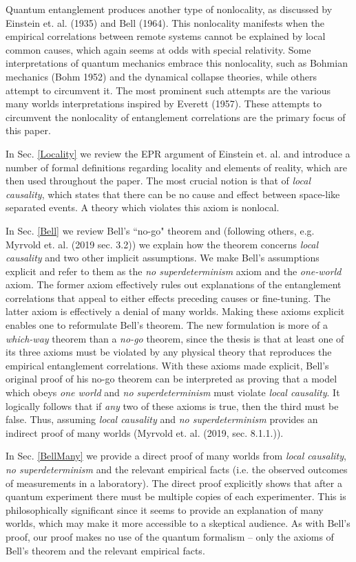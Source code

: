 \documentclass[a4paper]{article}
\begin{document}
Quantum entanglement produces another type of nonlocality, as discussed by Einstein et. al. (1935) and Bell (1964). This nonlocality manifests when the empirical correlations between remote systems cannot be explained by local common causes, which again seems at odds with special relativity. Some interpretations of quantum mechanics embrace this nonlocality, such as Bohmian mechanics (Bohm 1952) and the dynamical collapse theories, while others attempt to circumvent it. The most prominent such attempts are the various many worlds interpretations inspired by Everett (1957). These attempts to circumvent the nonlocality of entanglement correlations are the primary focus of this paper.

In Sec. \ref{Locality} we review the EPR argument of Einstein et. al. and introduce a number of formal definitions regarding locality and elements of reality, which are then used throughout the paper. The most crucial notion is that of \textit{local causality}, which states that there can be no cause and effect between space-like separated events. A theory which violates this axiom is nonlocal.

In Sec. \ref{Bell} we review Bell's ``no-go" theorem and (following others, e.g. Myrvold et. al. (2019 sec. 3.2)) we explain how the theorem concerns \textit{local causality} and two other implicit assumptions. We make Bell's assumptions explicit and refer to them as the \textit{no superdeterminism} axiom and the \textit{one-world} axiom. The former axiom effectively rules out explanations of the entanglement correlations that appeal to either effects preceding causes or fine-tuning. The latter axiom is effectively a denial of many worlds. Making these axioms explicit enables one to reformulate Bell's theorem. The new formulation is more of a \textit{which-way} theorem than a \textit{no-go} theorem, since the thesis is that at least one of its three axioms must be violated by any physical theory that reproduces the empirical entanglement correlations. With these axioms made explicit, Bell's original proof of his no-go theorem can be interpreted as proving that a model which obeys \textit{one world} and \textit{no superdeterminism} must violate \textit{local causality}. It logically follows that if \textit{any} two of these axioms is true, then the third must be false. Thus, assuming \textit{local causality} and \textit{no superdeterminism} provides an indirect proof of many worlds (Myrvold et. al. (2019, sec. 8.1.1.)).

In Sec. \ref{BellMany} we provide a direct proof of many worlds from \textit{local causality}, \textit{no superdeterminism} and the relevant empirical facts (i.e. the observed outcomes of measurements in a laboratory). The direct proof explicitly shows that after a quantum experiment there must be multiple copies of each experimenter. This is philosophically significant since it seems to provide an explanation of many worlds, which may make it more accessible to a skeptical audience. As with Bell's proof, our proof makes no use of the quantum formalism -- only the axioms of Bell's theorem and the relevant empirical facts.
\end{document}
